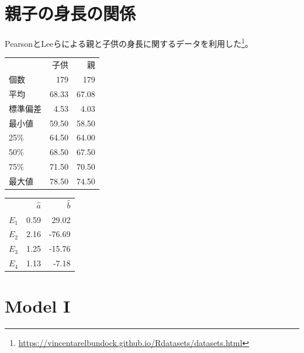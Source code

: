 \section{親子の身長の関係}


PearsonとLeeらによる親と子供の身長に関するデータを利用した\footnote{\url{https://vincentarelbundock.github.io/Rdatasets/datasets.html}}。
\begin{table}[http]
 \centering
 \begin{tabular}{lrr}
  {} &  子供 &  親 \\
  個数 & 179 &  179 \\
  平均  &  68.33 &   67.08 \\
  標準偏差   &   4.53 &    4.03 \\
  最小値   &  59.50 &   58.50 \\
  25\%   &  64.50 &   64.00 \\
  50\%   &  68.50 &   67.50 \\
  75\%   &  71.50 &   70.50 \\
  最大値   &  78.50 &   74.50 \\
 \end{tabular}
\end{table}


\begin{table}[http]
 \centering
\begin{tabular}{lrr}
{} &    $\hat{a}$ &      $\hat{b}$ \\
$E_1$ & 0.59 &  29.02 \\
 $E_2$ & 2.16 & -76.69 \\
$E_3$ & 1.25 & -15.76 \\
$E_4$ & 1.13 &  -7.18 \\
\end{tabular}
\end{table}




\section{Model I}




